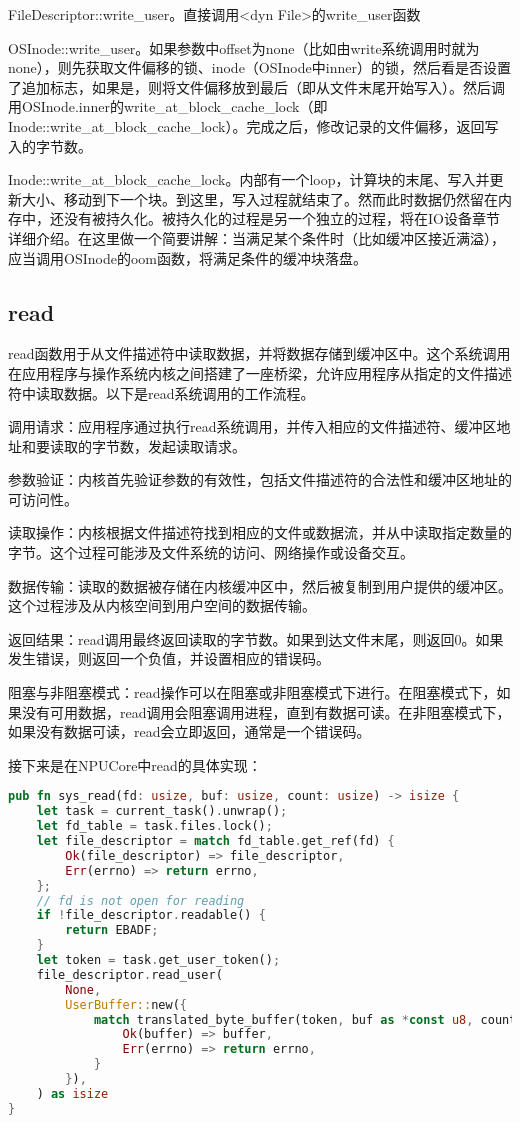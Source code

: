 FileDescriptor::write_user。直接调用<dyn File>的write_user函数

OSInode::write_user。如果参数中offset为none（比如由write系统调用时就为none），则先获取文件偏移的锁、inode（OSInode中inner）的锁，然后看是否设置了追加标志，如果是，则将文件偏移放到最后（即从文件末尾开始写入）。然后调用OSInode.inner的write_at_block_cache_lock（即Inode::write_at_block_cache_lock）。完成之后，修改记录的文件偏移，返回写入的字节数。

Inode::write_at_block_cache_lock。内部有一个loop，计算块的末尾、写入并更新大小、移动到下一个块。到这里，写入过程就结束了。然而此时数据仍然留在内存中，还没有被持久化。被持久化的过程是另一个独立的过程，将在IO设备章节详细介绍。在这里做一个简要讲解：当满足某个条件时（比如缓冲区接近满溢），应当调用OSInode的oom函数，将满足条件的缓冲块落盘。


\subsection{read}
read函数用于从文件描述符中读取数据，并将数据存储到缓冲区中。这个系统调用在应用程序与操作系统内核之间搭建了一座桥梁，允许应用程序从指定的文件描述符中读取数据。以下是read系统调用的工作流程。

调用请求：应用程序通过执行read系统调用，并传入相应的文件描述符、缓冲区地址和要读取的字节数，发起读取请求。

参数验证：内核首先验证参数的有效性，包括文件描述符的合法性和缓冲区地址的可访问性。

读取操作：内核根据文件描述符找到相应的文件或数据流，并从中读取指定数量的字节。这个过程可能涉及文件系统的访问、网络操作或设备交互。

数据传输：读取的数据被存储在内核缓冲区中，然后被复制到用户提供的缓冲区。这个过程涉及从内核空间到用户空间的数据传输。

返回结果：read调用最终返回读取的字节数。如果到达文件末尾，则返回0。如果发生错误，则返回一个负值，并设置相应的错误码。

阻塞与非阻塞模式：read操作可以在阻塞或非阻塞模式下进行。在阻塞模式下，如果没有可用数据，read调用会阻塞调用进程，直到有数据可读。在非阻塞模式下，如果没有数据可读，read会立即返回，通常是一个错误码。

接下来是在NPUCore中read的具体实现：

\begin{lstlisting}[language=rust]
pub fn sys_read(fd: usize, buf: usize, count: usize) -> isize {
    let task = current_task().unwrap();
    let fd_table = task.files.lock();
    let file_descriptor = match fd_table.get_ref(fd) {
        Ok(file_descriptor) => file_descriptor,
        Err(errno) => return errno,
    };
    // fd is not open for reading
    if !file_descriptor.readable() {
        return EBADF;
    }
    let token = task.get_user_token();
    file_descriptor.read_user(
        None,
        UserBuffer::new({
            match translated_byte_buffer(token, buf as *const u8, count) {
                Ok(buffer) => buffer,
                Err(errno) => return errno,
            }
        }),
    ) as isize
}
\end{lstlisting}

